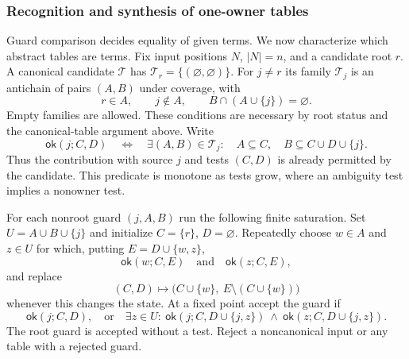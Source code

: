 \subsubsection{Recognition and synthesis of one-owner tables}
\label{app:owner-synthesis}

Guard comparison decides equality of given terms. We now characterize
which abstract tables are terms. Fix input positions $N$, $|N|=n$, and
a candidate root $r$. A canonical candidate $\mathcal T$ has
$\mathcal T_r=\{(\varnothing,\varnothing)\}$. For $j\ne r$ its
family $\mathcal T_j$ is an antichain of pairs $(A,B)$ under coverage,
with
\[
 r\in A,\qquad j\notin A,\qquad B\cap(A\cup\{j\})=\varnothing.
\]
Empty families are allowed. These conditions are necessary by root
status and the canonical-table argument above. Write
\[
 \mathsf{ok}(j;C,D)\quad\Longleftrightarrow\quad
 \exists(A,B)\in\mathcal T_j:\quad
 A\subseteq C,\quad B\subseteq C\cup D\cup\{j\}.
\]
Thus the contribution with source $j$ and tests $(C,D)$ is already
permitted by the candidate. This predicate is monotone as tests grow,
where an ambiguity test implies a nonowner test.

For each nonroot guard $(j,A,B)$ run the following finite saturation.
Set $U=A\cup B\cup\{j\}$ and initialize $C=\{r\}$, $D=\varnothing$.
Repeatedly choose $w\in A$ and $z\in U$ for which, putting
$E=D\cup\{w,z\}$,
\begin{equation}\label{owner:eq:saturation}
 \mathsf{ok}(w;C,E)\quad\text{and}\quad
 \mathsf{ok}(z;C,E),
\end{equation}
and replace
\[
 (C,D)\longmapsto
 \bigl(C\cup\{w\},\ E\setminus(C\cup\{w\})\bigr)
\]
whenever this changes the state. At a fixed point accept the guard if
\begin{equation}\label{owner:eq:finish}
 \mathsf{ok}(j;C,D),\quad\text{or}\quad
 \exists z\in U:\ 
 \mathsf{ok}(j;C,D\cup\{j,z\})\ \land\
 \mathsf{ok}(z;C,D\cup\{j,z\}).
\end{equation}
The root guard is accepted without a test. Reject a noncanonical input
or any table with a rejected guard.

